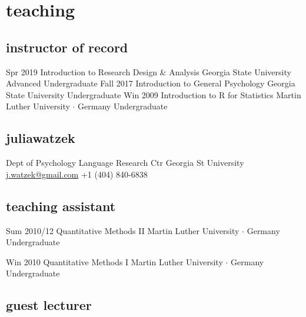 \documentclass[]{friggeri-cv}
\begin{document}
\section{teaching}


\subsection{instructor of record}

\begin{entrylist}
  \entry
    {Spr 2019}
    {Introduction to Research Design \& Analysis}
    {Georgia State University}
    {Advanced Undergraduate}
  \entry
    {Fall 2017}
    {Introduction to General Psychology}
    {Georgia State University}
    {Undergraduate}
  \entry
    {Win 2009}
    {Introduction to R for Statistics}
    {Martin Luther University $\cdot$ Germany}
    {Undergraduate}
\end{entrylist}


\newpage

\begin{aside}
  \section{{\normalfont julia}watzek}
    Dept of Psychology
    Language Research Ctr
    Georgia St University
    ~
    \href{mailto:j.watzek@gmail.com}{j.watzek@gmail.com}
    +1 (404) 840-6838
\end{aside}

\subsection{teaching assistant}

\begin{entrylist}
  \entry
    {Sum 2010/12}
    {Quantitative Methods II}
    {Martin Luther University $\cdot$ Germany}
    {Undergraduate}

  \entry
    {Win 2010}
    {Quantitative Methods I}
    {Martin Luther University $\cdot$ Germany}
    {Undergraduate}
\end{entrylist}

\subsection{guest lecturer}
\end{document}
